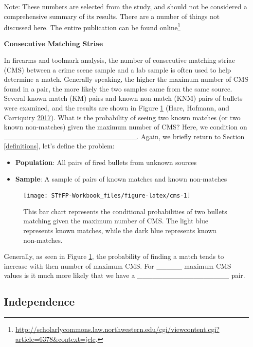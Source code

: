 \documentclass[]{book}
\providecommand{\tightlist}{%
  \setlength{\itemsep}{0pt}\setlength{\parskip}{0pt}}
\let\rmarkdownfootnote\footnote%
\def\footnote{\protect\rmarkdownfootnote}
\theoremstyle{definition}
\theoremstyle{definition}
\theoremstyle{remark}
\begin{document}
Note: These numbers are selected from the study, and should not be
considered a comprehensive summary of its results. There are a number of
things not discussed here. The entire publication can be found
online\footnote{\url{http://scholarlycommons.law.northwestern.edu/cgi/viewcontent.cgi?article=6378\&context=jclc}.}

\textbf{Consecutive Matching Striae}

In firearms and toolmark analysis, the number of consecutive matching
striae (CMS) between a crime scene sample and a lab sample is often used
to help determine a match. Generally speaking, the higher the maximum
number of CMS found in a pair, the more likely the two samples came from
the same source. Several known match (KM) pairs and known non-match
(KNM) pairs of bullets were examined, and the results are shown in
Figure \ref{fig:cms} (Hare, Hofmann, and Carriquiry
\protect\hyperlink{ref-hare}{2017}). What is the probability of seeing
two known matches (or two known non-matches) given the maximum number of
CMS? Here, we condition on
\_\_\_\_\_\_\_\_\_\_\_\_\_\_\_\_\_\_\_\_\_\_\_\_\_\_. Again, we briefly
return to Section \ref{definitions}, let's define the problem:

\begin{itemize}
\tightlist
\item
  \textbf{Population}: All pairs of fired bullets from unknown sources
\item
  \textbf{Sample}: A sample of pairs of known matches and known
  non-matches
\end{itemize}

\begin{figure}[h]

{\centering \texttt{[image: STfFP-Workbook\_files/figure-latex/cms-1]} 

}

\caption{This bar chart represents the conditional probabilities of two bullets matching given the maximum number of CMS. The light blue represents known matches, while the dark blue represents known non-matches.}\label{fig:cms}
\end{figure}

Generally, as seen in Figure \ref{fig:cms}, the probability of finding a
match tends to increase with then number of maximum CMS. For \_\_\_\_\_
maximum CMS values is it much more likely that we have a
\_\_\_\_\_\_\_\_\_\_\_\_\_\_\_\_\_\_ pair.

\subsection{Independence}\label{independence}
\end{document}
